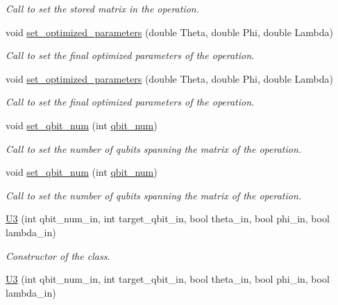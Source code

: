 \begin{DoxyCompactItemize}
\begin{DoxyCompactList}\small\item\em Call to set the stored matrix in the operation. \end{DoxyCompactList}\item 
void \hyperlink{class_u3_a4c95c0d73bb15789ab0b50bdcd1475f0}{set\+\_\+optimized\+\_\+parameters} (double Theta, double Phi, double Lambda)
\begin{DoxyCompactList}\small\item\em Call to set the final optimized parameters of the operation. \end{DoxyCompactList}\item 
void \hyperlink{class_u3_a4c95c0d73bb15789ab0b50bdcd1475f0}{set\+\_\+optimized\+\_\+parameters} (double Theta, double Phi, double Lambda)
\begin{DoxyCompactList}\small\item\em Call to set the final optimized parameters of the operation. \end{DoxyCompactList}\item 
void \hyperlink{class_u3_acba4c571368bbd628b817b89d96a6ab3}{set\+\_\+qbit\+\_\+num} (int \hyperlink{class_operation_aecd5fbf1dd4ea532b2e58471ff8bad69}{qbit\+\_\+num})
\begin{DoxyCompactList}\small\item\em Call to set the number of qubits spanning the matrix of the operation. \end{DoxyCompactList}\item 
void \hyperlink{class_u3_acba4c571368bbd628b817b89d96a6ab3}{set\+\_\+qbit\+\_\+num} (int \hyperlink{class_operation_aecd5fbf1dd4ea532b2e58471ff8bad69}{qbit\+\_\+num})
\begin{DoxyCompactList}\small\item\em Call to set the number of qubits spanning the matrix of the operation. \end{DoxyCompactList}\item 
\hyperlink{class_u3_a3fbe983c050339a247e05a2eea070542}{U3} (int qbit\+\_\+num\+\_\+in, int target\+\_\+qbit\+\_\+in, bool theta\+\_\+in, bool phi\+\_\+in, bool lambda\+\_\+in)
\begin{DoxyCompactList}\small\item\em Constructor of the class. \end{DoxyCompactList}\item 
\hyperlink{class_u3_a3fbe983c050339a247e05a2eea070542}{U3} (int qbit\+\_\+num\+\_\+in, int target\+\_\+qbit\+\_\+in, bool theta\+\_\+in, bool phi\+\_\+in, bool lambda\+\_\+in)

\end{DoxyCompactItemize}
